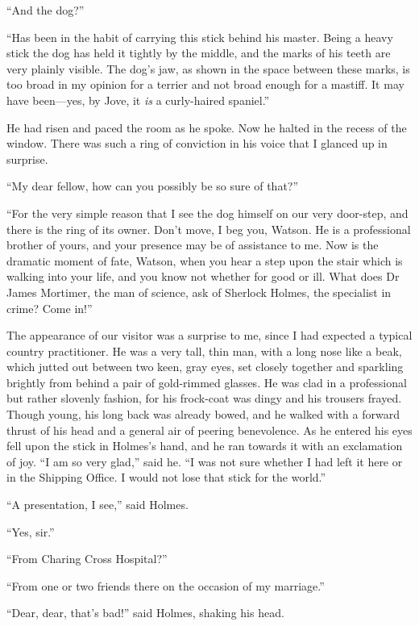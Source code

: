 \documentclass[paper=5.5in:8.5in,BCOR=7mm,twoside,DIV=calc,12pt,usegeometry,openany,chapterprefix,endperiod,headings=big]{scrbook} %
\begin{document}
\enquote{And the dog?}

\enquote{Has been in the habit of carrying this stick behind his master. Being a heavy stick the dog has held it tightly by the middle, and the marks of his teeth are very plainly visible. The dog's jaw, as shown in the space between these marks, is too broad in my opinion for a terrier and not broad enough for a mastiff. It may have been---yes, by Jove, it \emph{is} a curly-haired spaniel.}

He had risen and paced the room as he spoke. Now he halted in the recess of the window. There was such a ring of conviction in his voice that I glanced up in surprise.

\enquote{My dear fellow, how can you possibly be so sure of that?}

\enquote{For the very simple reason that I see the dog himself on our very door-step, and there is the ring of its owner. Don't move, I beg you, Watson. He is a professional brother of yours, and your presence may be of assistance to me. Now is the dramatic moment of fate, Watson, when you hear a step upon the stair which is walking into your life, and you know not whether for good or ill. What does Dr James Mortimer, the man of science, ask of Sherlock Holmes, the specialist in crime? Come in!}

The appearance of our visitor was a surprise to me, since I had expected a typical country practitioner. He was a very tall, thin man, with a long nose like a beak, which jutted out between two keen, gray eyes, set closely together and sparkling brightly from behind a pair of gold-rimmed glasses. He was clad in a professional but rather slovenly fashion, for his frock-coat was dingy and his trousers frayed. Though young, his long back was already bowed, and he walked with a forward thrust of his head and a general air of peering benevolence. As he entered his eyes fell upon the stick in Holmes's hand, and he ran towards it with an exclamation of joy. \enquote{I am so very glad,} said he. \enquote{I was not sure whether I had left it here or in the Shipping Office. I would not lose that stick for the world.}

\enquote{A presentation, I see,} said Holmes.

\enquote{Yes, sir.}

\enquote{From Charing Cross Hospital?}

\enquote{From one or two friends there on the occasion of my marriage.}

\enquote{Dear, dear, that's bad!} said Holmes, shaking his head.
\end{document}
